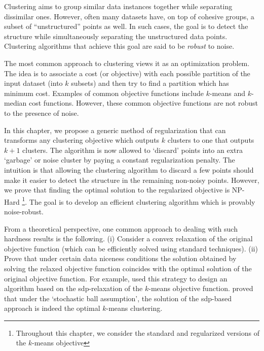 \documentclass[12pt]{article}
\begin{document}
\fi

Clustering aims to group similar data instances together while separating dissimilar ones. However, often many datasets have, on top of cohesive groups, a subset of ``unstructured'' points as well. In such cases, the goal is to detect the structure while simultaneously separating the unstructured data points. Clustering algorithms that achieve this goal are said to be {\em robust} to noise.

The most common approach to clustering views it as an optimization problem. The idea is to associate a cost (or objective) with each possible partition of the input dataset (into $k$ subsets) and then try to find a partition which has minimum cost. Examples of common objective functions include $k$-means and $k$-median cost functions. However, these common objective functions are not robust to the presence of noise.   

In this chapter, we propose a generic method of regularization that can transforms any clustering objective which outputs $k$ clusters to one that outputs $k+1$ clusters. The algorithm is now allowed to `discard' points into an extra `garbage' or noise cluster by paying a constant regularization penalty. The intuition is that allowing the clustering algorithm to discard a few points should make it easier to detect the structure in the remaining non-noisy points. However, we prove that finding the optimal solution to the regularized objective is NP-Hard \footnote{Throughout this chapter, we consider the standard and regularized versions of the $k$-means objective}. The goal is to develop an efficient clustering algorithm which is provably noise-robust.

From a theoretical perspective, one common approach to dealing with such hardness results is the following. (i) Consider a convex relaxation of the original objective function (which can be efficiently solved using standard techniques). (ii) Prove that under certain data niceness conditions the solution obtained by solving the relaxed objective function coincides with the optimal solution of the original objective function. For example, \cite{peng2007approximating} used this strategy to design an algorithm based on the sdp-relaxation of the $k$-means objective function. \cite{awasthi2015relax} proved that under the `stochastic ball assumption', the solution of the sdp-based approach is indeed the optimal $k$-means clustering. 
\end{document}
